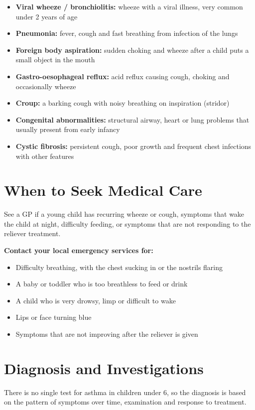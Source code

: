 \begin{itemize}
    \item \textbf{Viral wheeze / bronchiolitis:} wheeze with a viral illness, very common under 2 years of age
    \item \textbf{Pneumonia:} fever, cough and fast breathing from infection of the lungs
    \item \textbf{Foreign body aspiration:} sudden choking and wheeze after a child puts a small object in the mouth
    \item \textbf{Gastro-oesophageal reflux:} acid reflux causing cough, choking and occasionally wheeze
    \item \textbf{Croup:} a barking cough with noisy breathing on inspiration (stridor)
    \item \textbf{Congenital abnormalities:} structural airway, heart or lung problems that usually present from early infancy
    \item \textbf{Cystic fibrosis:} persistent cough, poor growth and frequent chest infections with other features
\end{itemize}

\section*{When to Seek Medical Care}
See a GP if a young child has recurring wheeze or cough, symptoms that wake the child at night, difficulty feeding, or symptoms that are not responding to the reliever treatment.

\textbf{Contact your local emergency services for:}
\begin{itemize}
    \item Difficulty breathing, with the chest sucking in or the nostrils flaring
    \item A baby or toddler who is too breathless to feed or drink
    \item A child who is very drowsy, limp or difficult to wake
    \item Lips or face turning blue
    \item Symptoms that are not improving after the reliever is given
\end{itemize}

\section*{Diagnosis and Investigations}
There is no single test for asthma in children under 6, so the diagnosis is based on the pattern of symptoms over time, examination and response to treatment.

